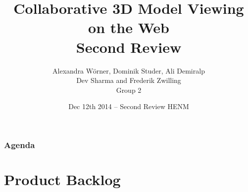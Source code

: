 

\title[Collaborative 3D Model Viewing on the Web]{Collaborative 3D Model Viewing on the Web\\ Second Review}
\author[Group 2]{%
  Alexandra Wörner, Dominik Studer, Ali Demiralp\\ Dev Sharma and Frederik Zwilling \\
  \bigskip
  {\scriptsize Group 2}
}

\date[Dec 12th 2014 @ HENM 2014]{Dec 12th 2014 -- Second Review HENM}



\frame[plain]{\titlepage}
\addtocounter{framenumber}{-1}

\begin{frame}
  \frametitle{Agenda}
  \tableofcontents[hideallsubsections]
\end{frame}

\section{Product Backlog}

